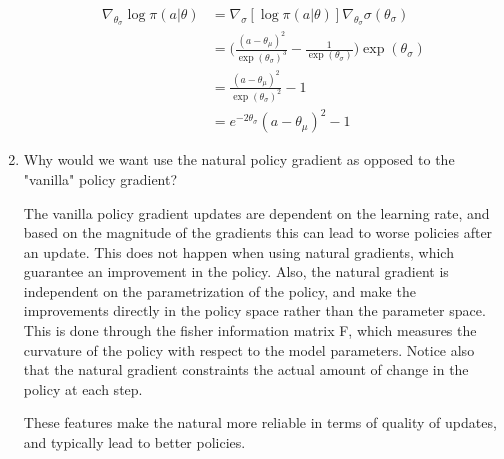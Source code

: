 \documentclass{exam}
\begin{document}
\begin{enumerate}
\begin{solutionorlines}[2in]
            \begin{align*}
                \nabla_{\theta_\sigma} \log \pi(a | \theta) &= \nabla_{\sigma} [\log \pi(a | \theta) ] \nabla_{\theta_{\sigma}} \sigma(\theta_{\sigma}) \\
                &= \bigg( \frac{(a - \theta_{\mu})^2}{\exp(\theta_{\sigma})^3} - \frac{1}{\exp(\theta_{\sigma}) } \bigg)  \exp(\theta_{\sigma}) \\
                &= \frac{(a - \theta_{\mu})^2}{\exp(\theta_{\sigma})^2} - 1\\
                &= e^{-2\theta_\sigma}(a - \theta_{\mu})^2 - 1
            \end{align*}
        \end{solutionorlines}
    \item Why would we want use the natural policy gradient as opposed to the "vanilla" policy gradient?
        \begin{solutionorlines}[2in]
            
            The vanilla policy gradient updates are dependent on the learning rate, and based on the magnitude of the gradients this can lead to worse policies after an update. This does not happen when using natural gradients, which guarantee an improvement in the policy. Also, the natural gradient is independent on the parametrization of the policy, and make the improvements directly in the policy space rather than the parameter space. This is done through the fisher information matrix F, which measures the curvature of the policy with respect to the model parameters. Notice also that the natural gradient constraints the actual amount of change in the policy at each step.
            
            These features make the natural more reliable in terms of quality of updates, and typically lead to better policies.
            

\end{solutionorlines}
\end{enumerate}
\end{document}
